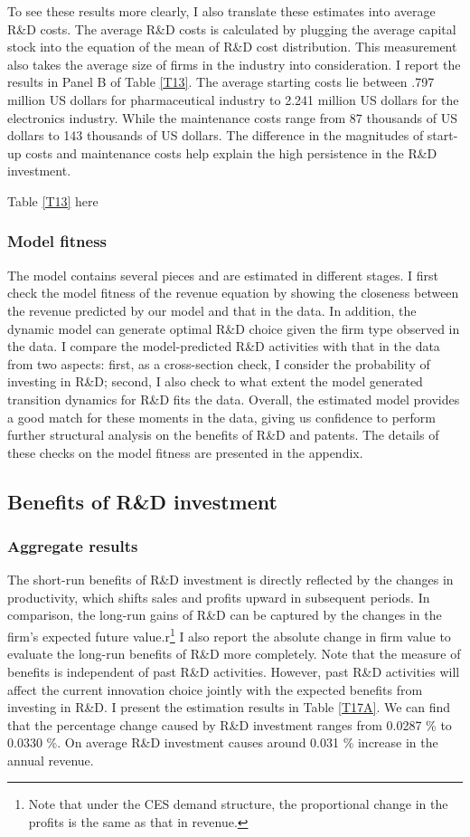 \documentclass[English]{article}
\begin{document}
To see these results more clearly, I also translate these estimates into average R\&D costs. The average R\&D costs is calculated by plugging the average capital stock into the equation of the mean of R\&D cost distribution. This measurement also takes the average size of firms in the industry into consideration. I report the results in Panel B of Table \ref{T13}. The average starting costs lie between .797 million US dollars for pharmaceutical industry to 2.241 million US dollars for the electronics industry. While the maintenance costs range from 87 thousands of US dollars to 143 thousands of US dollars. The difference in the magnitudes of start-up costs and maintenance costs help explain the high persistence in the R\&D investment. 
\begin{center}
Table \ref{T13} here
\end{center}
\subsubsection{Model fitness}
The model contains several pieces and are estimated in different stages. I first check the model fitness of the revenue equation by showing the closeness between the revenue predicted by our model and that in the data. In addition, the dynamic model can generate optimal R\&D choice given the firm type observed in the data. I compare the model-predicted R\&D activities with that in the data from two aspects: first, as a cross-section check, I consider the probability of investing in R\&D; second, I also check to what extent the model generated transition dynamics for R\&D fits the data. Overall, the estimated model provides a good match for these moments in the data, giving us confidence to perform further structural analysis on the benefits of R\&D and patents. The details of these checks on the model fitness are presented in the appendix.

\subsection{Benefits of R\&D investment}
\subsubsection{Aggregate results}
The short-run benefits of R\&D investment is directly reflected by the changes in productivity, which shifts sales and profits upward in subsequent periods. In comparison, the long-run gains of R\&D can be captured by the changes in the firm's expected future value.r\footnote{Note that under the CES demand structure, the proportional change in the profits is the same as that in revenue.} I also report the absolute change in firm value to evaluate the long-run benefits of R\&D more completely. Note that the measure of benefits is independent of past R\&D activities. However, past R\&D activities will affect the current innovation choice jointly with the expected benefits from investing in R\&D. I present the estimation results in Table \ref{T17A}. We can find that the percentage change caused by R\&D investment ranges from 0.0287 \% to 0.0330 \%. On average R\&D investment causes around 0.031 \% increase in the annual revenue. 
\end{document}
